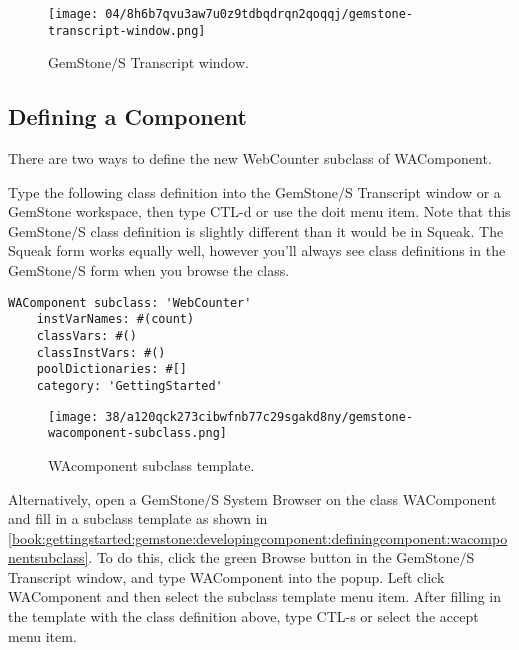 \documentclass[a4paper,10pt,twoside]{book}
\newcommand{\ct}[1]{{\small\ttfamily\textup{#1}}}
\begin{document}
\begin{figure}[h!tbp]
	\begin{center}
		\texttt{[image: 04/8h6b7qvu3aw7u0z9tdbqdrqn2qoqqj/gemstone-transcript-window.png]}
		\caption{GemStone$/$S Transcript window.\label{book:gettingstarted:gemstone:developingcomponent:transcriptwindow}}
	\end{center}
\end{figure}


\subsection{Defining a Component}
\label{book:gettingstarted:gemstone:developingcomponent:definingcomponent}

There are two ways to define the new \ct{WebCounter} subclass of \ct{WAComponent}.

Type the following class definition into the GemStone$/$S Transcript window or a GemStone workspace, then type CTL-d or use the doit menu item. Note that this GemStone$/$S class definition is slightly different than it would be in Squeak. The Squeak form works equally well, however you'll always see class definitions in the GemStone$/$S form when you browse the class.

\begin{lstlisting}
WAComponent subclass: 'WebCounter'
    instVarNames: #(count)
    classVars: #()
    classInstVars: #()
    poolDictionaries: #[]
    category: 'GettingStarted'
\end{lstlisting}

\begin{figure}[h!tbp]
	\begin{center}
		\texttt{[image: 38/a120qck273cibwfnb77c29sgakd8ny/gemstone-wacomponent-subclass.png]}
		\caption{WAcomponent subclass template.\label{book:gettingstarted:gemstone:developingcomponent:definingcomponent:wacomponentsubclass}}
	\end{center}
\end{figure}


Alternatively, open a GemStone$/$S System Browser on the class \ct{WAComponent} and fill in a subclass template as shown in \autoref{book:gettingstarted:gemstone:developingcomponent:definingcomponent:wacomponentsubclass}. To do this, click the green Browse button in the GemStone$/$S Transcript window, and type WAComponent into the popup. Left click WAComponent and then select the subclass template menu item. After filling in the template with the class definition above, type CTL-s or select the accept menu item.
\end{document}
